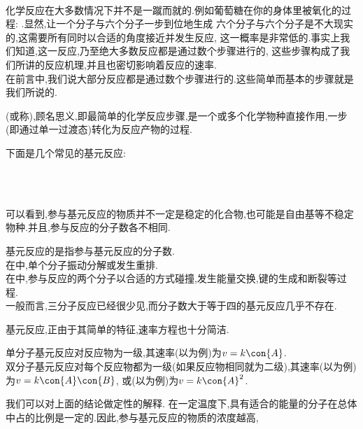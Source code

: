 \documentclass{ctexart}
\begin{document}
\pagestyle{plain}
\noindent{}\vspace{15pt}\\
\indent 化学反应在大多数情况下并不是一蹴而就的.例如葡萄糖在你的身体里被氧化的过程:%
.显然,让一个分子与六个分子一步到位地生成%
六个分子与六个分子是不大现实的,这需要所有同时以合适的角度接近并发生反应,%
这一概率是非常低的.事实上我们知道,这一反应,乃至绝大多数反应都是通过数个步骤进行的,%
这些步骤构成了我们所讲的反应机理,并且也密切影响着反应的速率.\vspace{12pt}\\
\indent 在前言中,我们说大部分反应都是通过数个步骤进行的.这些简单而基本的步骤就是我们所说的.
\begin{definition}[7C.1.1 基元反应]
    (或称),顾名思义,即最简单的化学反应步骤,是一个或多个化学物种直接作用,一步(即通过单一过渡态)转化为反应产物的过程.
\end{definition}
下面是几个常见的基元反应:
\begin{tightcenter}
    \\
    \\
\end{tightcenter}
可以看到,参与基元反应的物质并不一定是稳定的化合物,也可能是自由基等不稳定物种.并且,参与反应的分子数各不相同.
\begin{theorem}[7C.1.2 基元反应的分子数]
    基元反应的是指参与基元反应的分子数.\\
    在中,单个分子振动分解或发生重排.\\
    在中,参与反应的两个分子以合适的方式碰撞,发生能量交换,键的生成和断裂等过程.\\
    一般而言,三分子反应已经很少见,而分子数大于等于四的基元反应几乎不存在.
\end{theorem}
基元反应,正由于其简单的特征,速率方程也十分简洁.
\begin{theorem}[7C.1.3 基元反应的速率方程]
    单分子基元反应对反应物为一级,其速率(以为例)为$v=k\con{A}$.\\
    双分子基元反应对每个反应物都为一级(如果反应物相同就为二级),其速率(以为例)为$v=k\con{A}\con{B}$,%
    或(以为例)为$v=k\con{A}^2$.
\end{theorem}
我们可以对上面的结论做定性的解释.%
在一定温度下,具有适合的能量的分子在总体中占的比例是一定的.因此,参与基元反应的物质的浓度越高,%
\end{document}
